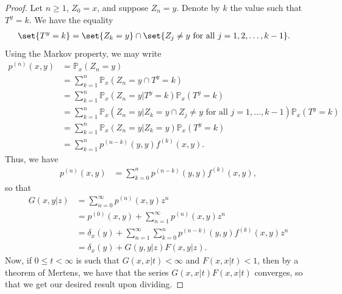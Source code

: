 \documentclass[10pt]{mypackage}
\begin{document}
\begin{proof}
  Let $n\geq 1$, $Z_0 = x$, and suppose $Z_n = y$. Denote by $k$ the value such that $T^y = k$. We have the equality
  \begin{align*}
    \set{T^y = k} &= \set{Z_k=y}\cap \set{Z_j\neq y\text{ for all }j=1,2,\dots,k-1}.
  \end{align*}
  Using the Markov property, we may write
  \begin{align*}
    p^{(n)}\left( x,y \right) &= \mathbb{P}_x\left( Z_n=y \right)\\
                              &= \sum_{k=1}^{n} \mathbb{P}_x\left( Z_n=y\cap T^y = k \right)\\
                              &= \sum_{k=1}^{n} \mathbb{P}_x\left( Z_n=y|T^y=k \right) \mathbb{P}_x\left( T^y=k \right)\\
                              &= \sum_{k=1}^{n} \mathbb{P}_x\left( Z_n=y|Z_k=y\cap Z_j\neq y\text{ for all }j=1,\dots,k-1 \right) \mathbb{P}_x\left( T^y=k \right)\\
                              &= \sum_{k=1}^{n} \mathbb{P}_x\left( Z_n=y|Z_k=y \right) \mathbb{P}_x\left( T^y=k \right)\\
                              &= \sum_{k=1}^{n} p^{(n-k)}\left( y,y \right) f^{(k)}\left( x,y \right).
  \end{align*}
  Thus, we have
  \begin{align*}
    p^{(n)}\left( x,y \right) &= \sum_{k=0}^{n}p^{(n-k)}\left( y,y \right)f^{(k)}\left( x,y \right),
  \end{align*}
  so that
  \begin{align*}
    G\left( x,y|z \right) &= \sum_{n=0}^{\infty}p^{(n)}\left( x,y \right)z^{n}\\
                          &= p^{(0)}\left( x,y \right) + \sum_{n=1}^{\infty}p^{(n)}\left( x,y \right)z^{n}\\
                          &= \delta_x(y) + \sum_{n=1}^{\infty}\sum_{k=0}^{n}p^{(n-k)}\left( y,y \right)f^{(k)}\left( x,y \right) z^{n}\\
                          &= \delta_x(y) + G\left( y,y|z \right)F\left( x,y|z \right).
  \end{align*}
  Now, if $0\leq t < \infty$ is such that $G\left( x,x|t \right) < \infty$ and $F\left( x,x|t \right) < 1$, then by a theorem of Mertens, we have that the series $G\left( x,x|t \right)F\left( x,x|t \right)$ converges, so that we get our desired result upon dividing.
\end{proof}
\end{document}
